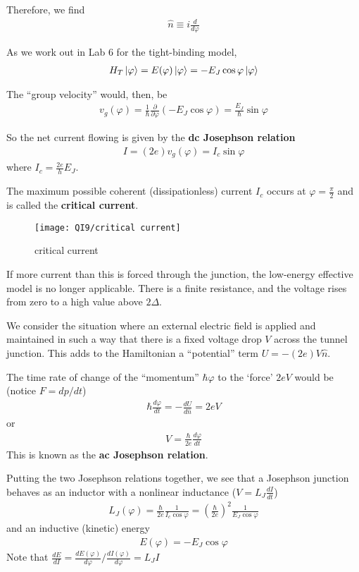 Therefore, we find
\begin{align*}
    \hat{n}\equiv i\frac{d}{d\varphi}
\end{align*}

As we work out in Lab 6 for the tight-binding model,
\begin{align*}
    H_T \ket{\varphi}= E(\varphi)\ket{\varphi}=-E_J\cos\varphi\ket{\varphi}
\end{align*}

The ``group velocity'' would, then, be
\begin{align*}
    v_g(\varphi)=\frac{1}{\hbar}\frac{\partial}{\partial \varphi}(-E_J\cos\varphi)=\frac{E_J}{\hbar}\sin\varphi
\end{align*}

So the net current flowing is given by the \textbf{dc Josephson relation}
\begin{align*}
    I=(2e)v_g(\varphi)=I_c\sin \varphi
\end{align*}
where $I_c=\frac{2e}{h}E_J$. 

The maximum possible coherent (dissipationless) current $I_c$ occurs at $\varphi=\frac{\pi}{2}$ and is called the \textbf{critical current}.

\begin{figure}[H]
    \centering
    \texttt{[image: QI9/critical current]}
    \caption{critical current}
\end{figure}

If more current than this is forced through the junction, the low-energy effective model is no longer applicable. There is a finite resistance, and the voltage rises from zero to a high value above $2\Delta$. 

We consider the situation where an external electric field is applied and maintained in such a way that there is a fixed voltage drop $V$ across the tunnel junction. This adds to the Hamiltonian a ``potential'' term $U=-(2e)V\hat{n}$. 

The time rate of change of the ``momentum'' $\hbar\varphi$ to the `force' $2eV$ would be (notice $F = dp/dt$)
\begin{align*}
    \hbar\frac{d\varphi}{dt}=-\frac{dU}{d\hat{n}}=2eV
\end{align*}
or
\begin{align*}
    V=\frac{\hbar}{2e}\frac{d\varphi}{dt}
\end{align*}
This is known as the \textbf{ac Josephson relation}. 

Putting the two Josephson relations together, we see that a Josephson junction behaves as an inductor with a nonlinear inductance ($V=L_J \frac{dI}{dt}$)
\begin{align*}
    L_J(\varphi)=\frac{\hbar}{2e}\frac{1}{I_c\cos\varphi}=\left( \frac{\hbar}{2e} \right)^2\frac{1}{E_J\cos\varphi}
\end{align*}
and an inductive (kinetic) energy
\begin{align*}
    E(\varphi)=-E_J\cos\varphi
\end{align*}
Note that $\frac{dE}{dI}=\frac{dE(\varphi)}{d\varphi} / \frac{dI(\varphi)}{d\varphi} =L_J I$

